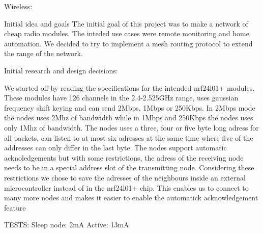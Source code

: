 Wireless:

Initial idea and goals The initial goal of this project was to make a
network of cheap radio modules. The inteded use cases were remote
monitoring and home automation. We decided to try to implement a mesh
routing protocol to extend the range of the network.

Initial research and design decisions: 

We started off by reading the
specifications for the intended nrf24l01+ modules. These modules have
126 channels in the 2.4-2.525GHz range, uses gaussian frequency shift
keying and can send 2Mbps, 1Mbps or 250Kbps. In 2Mbps mode the nodes
uses 2Mhz of bandwidth while in 1Mbps and 250Kbps the nodes uses only
1Mhz of bandwidth.  The nodes uses a three, four or five byte long
adress for all packets, can listen to at most six adresses at the same
time where five of the addresses can only differ in the last byte. The
nodes support automatic acknoledgements but with some restrictions,
the adress of the receiving node needs to be in a special address slot
of the transmitting node.  Considering these restrictions we chose to
save the adresses of the neighbours inside an external microcontroller
instead of in the nrf24l01+ chip. This enables us to connect to many
more nodes and makes it easier to enable the automatick
acknowledgement feature


TESTS:
Sleep node: 2mA 
Active: 13mA

